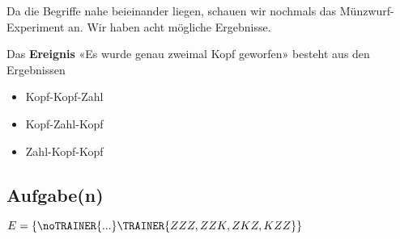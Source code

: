 Da die Begriffe nahe beieinander liegen, schauen wir
nochmals das Münzwurf-Experiment an. Wir haben acht mögliche
Ergebnisse. 

Das \textbf{Ereignis} «Es wurde genau zweimal Kopf geworfen» besteht
aus den Ergebnissen

\begin{itemize}
\item Kopf-Kopf-Zahl
\item Kopf-Zahl-Kopf
\item Zahl-Kopf-Kopf
\end{itemize}

\subsection*{Aufgabe(n)}

$E = \{\noTRAINER{...}\TRAINER{ZZZ,ZZK, ZKZ, KZZ\}}$



\newpage

\newpage

